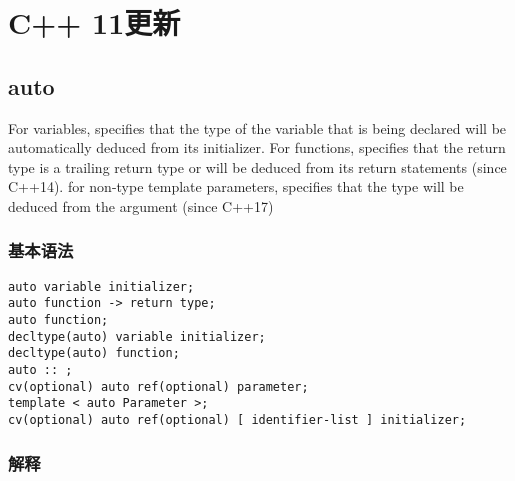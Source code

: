 \chapter{C++ 11更新}

\section{auto}

For variables, specifies that the type of the variable that is being declared will be automatically deduced from its initializer. For functions, specifies that the return type is a trailing return type or will be deduced from its return statements (since C++14). for non-type template parameters, specifies that the type will be deduced from the argument (since C++17) 

\subsection{基本语法}

\begin{lstlisting}[style=CppStyle]
auto variable initializer;
auto function -> return type;
auto function;
decltype(auto) variable initializer;
decltype(auto) function;
auto :: ;
cv(optional) auto ref(optional) parameter;
template < auto Parameter >;
cv(optional) auto ref(optional) [ identifier-list ] initializer;
\end{lstlisting}

\subsection{解释}

